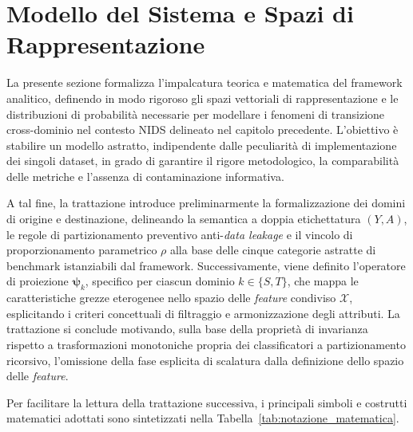 \section{Modello del Sistema e Spazi di Rappresentazione}
\label{sec:modello_sistema}

La presente sezione formalizza l'impalcatura teorica e matematica del framework analitico, definendo in modo rigoroso gli spazi vettoriali di rappresentazione e le distribuzioni di probabilità necessarie per modellare i fenomeni di transizione cross-dominio nel contesto NIDS delineato nel capitolo precedente.
L'obiettivo è stabilire un modello astratto, indipendente dalle peculiarità di implementazione dei singoli dataset, in grado di garantire il rigore metodologico, la comparabilità delle metriche e l'assenza di contaminazione informativa.

A tal fine, la trattazione introduce preliminarmente la formalizzazione dei domini di origine e destinazione, delineando la semantica a doppia etichettatura $(Y, A)$, le regole di partizionamento preventivo anti-\textit{data leakage} e il vincolo di proporzionamento parametrico $\rho$ alla base delle cinque categorie astratte di benchmark istanziabili dal framework. 
Successivamente, viene definito l'operatore di proiezione $\boldsymbol{\psi}_k$, specifico per ciascun dominio $k \in \{S, T\}$, che mappa le caratteristiche grezze eterogenee nello spazio delle \textit{feature} condiviso $\mathcal{X}$, esplicitando i criteri concettuali di filtraggio e armonizzazione degli attributi. 
La trattazione si conclude motivando, sulla base della proprietà di invarianza rispetto a trasformazioni monotoniche propria dei classificatori a partizionamento ricorsivo, l'omissione della fase esplicita di scalatura dalla definizione dello spazio delle \textit{feature}.

Per facilitare la lettura della trattazione successiva, i principali simboli e costrutti matematici adottati sono sintetizzati nella Tabella~\ref{tab:notazione_matematica}.

